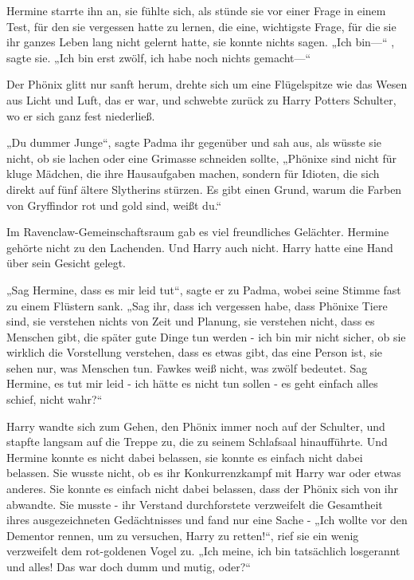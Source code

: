 {Hermine starrte ihn an, sie fühlte sich, als stünde sie vor einer Frage in einem Test, für den sie vergessen hatte zu lernen, die eine, wichtigste Frage, für die sie ihr ganzes Leben lang nicht gelernt hatte, sie konnte nichts sagen. „Ich bin—“ , sagte sie. „Ich bin erst zwölf, ich habe noch nichts gemacht—“

Der Phönix glitt nur sanft herum, drehte sich um eine Flügelspitze wie das Wesen aus Licht und Luft, das er war, und schwebte zurück zu Harry Potters Schulter, wo er sich ganz fest niederließ.

„Du dummer Junge“, sagte Padma ihr gegenüber und sah aus, als wüsste sie nicht, ob sie lachen oder eine Grimasse schneiden sollte, „Phönixe sind nicht für kluge Mädchen, die ihre Hausaufgaben machen, sondern für Idioten, die sich direkt auf fünf ältere Slytherins stürzen. Es gibt einen Grund, warum die Farben von Gryffindor rot und gold sind, weißt du.“

Im Ravenclaw-Gemeinschaftsraum gab es viel freundliches Gelächter. Hermine gehörte nicht zu den Lachenden. Und Harry auch nicht. Harry hatte eine Hand über sein Gesicht gelegt.

„Sag Hermine, dass es mir leid tut“, sagte er zu Padma, wobei seine Stimme fast zu einem Flüstern sank. „Sag ihr, dass ich vergessen habe, dass Phönixe Tiere sind, sie verstehen nichts von Zeit und Planung, sie verstehen nicht, dass es Menschen gibt, die später gute Dinge tun werden - ich bin mir nicht sicher, ob sie wirklich die Vorstellung verstehen, dass es etwas gibt, das eine Person ist, sie sehen nur, was Menschen tun. Fawkes weiß nicht, was zwölf bedeutet. Sag Hermine, es tut mir leid - ich hätte es nicht tun sollen - es geht einfach alles schief, nicht wahr?“

Harry wandte sich zum Gehen, den Phönix immer noch auf der Schulter, und stapfte langsam auf die Treppe zu, die zu seinem Schlafsaal hinaufführte. Und Hermine konnte es nicht dabei belassen, sie konnte es einfach nicht dabei belassen. Sie wusste nicht, ob es ihr Konkurrenzkampf mit Harry war oder etwas anderes. Sie konnte es einfach nicht dabei belassen, dass der Phönix sich von ihr abwandte. Sie musste - ihr Verstand durchforstete verzweifelt die Gesamtheit ihres ausgezeichneten Gedächtnisses und fand nur eine Sache - „Ich wollte vor den Dementor rennen, um zu versuchen, Harry zu retten!“, rief sie ein wenig verzweifelt dem rot-goldenen Vogel zu. „Ich meine, ich bin tatsächlich losgerannt und alles! Das war doch dumm und mutig, oder?“

}
